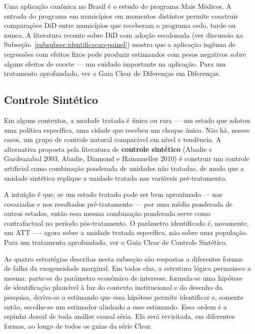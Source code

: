 Uma aplicação canônica no Brasil é o estudo do programa Mais Médicos. A entrada do programa em municípios em momentos distintos permite construir comparações DiD entre municípios que receberam o programa cedo, tarde ou nunca. A literatura recente sobre DiD com adoção escalonada (ver discussão na Subseção~\ref{subsubsec:identificacao-painel}) mostra que a aplicação ingênua de regressões com efeitos fixos pode produzir estimandos com pesos negativos sobre alguns efeitos de coorte --- um cuidado importante na aplicação. Para um tratamento aprofundado, ver o Guia Clear de Diferenças em Diferenças.

\subsection{Controle Sintético}
\label{subsubsec:controle-sintetico}

Em alguns contextos, a unidade tratada é única ou rara --- um estado que adotou uma política específica, uma cidade que recebeu um choque único. Não há, nesses casos, um grupo de controle natural comparável em nível e tendência. A alternativa proposta pela literatura de \textbf{controle sintético} (Abadie e Gardeazabal 2003, Abadie, Diamond e Hainmueller 2010) é construir um controle artificial como combinação ponderada de unidades não tratadas, de modo que a unidade sintética replique a unidade tratada nas variáveis pré-tratamento.

A intuição é que, se um estado tratado pode ser bem aproximado --- nas covariadas e nos resultados pré-tratamento --- por uma média ponderada de outros estados, então essa mesma combinação ponderada serve como contrafactual no período pós-tratamento. O parâmetro identificado é, novamente, um ATT ---- agora sobre a unidade tratada específica, não sobre uma população. Para um tratamento aprofundado, ver o Guia Clear de Controle Sintético.

\bigskip

As quatro estratégias descritas nesta subseção são respostas a diferentes formas de falha da exogeneidade marginal. Em todas elas, a estrutura lógica permanece a mesma: parte-se do parâmetro econômico de interesse, formula-se uma hipótese de identificação plausível à luz do contexto institucional e do desenho da pesquisa, deriva-se o estimando que essa hipótese permite identificar e, somente então, escolhe-se um estimador alinhado a esse estimando. Essa ordem é a espinha dorsal de toda análise causal séria. Ela será revisitada, em diferentes formas, ao longo de todos os guias da série Clear.

